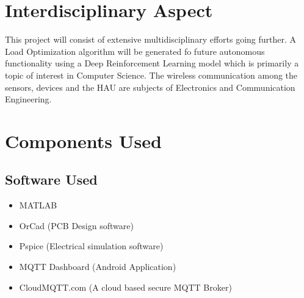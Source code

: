         \section{Interdisciplinary Aspect}
        	This project will consist of extensive multidisciplinary efforts going further.
        	A Load Optimization algorithm will be generated fo future autonomous functionality using a Deep Reinforcement Learning model which is primarily a topic of interest in Computer Science.
        	The wireless communication among the sensors, devices and the HAU are subjects of Electronics and Communication Engineering.\\
        \section{Components Used}
	        \subsection{Software Used}
	        \begin{itemize}
	        	\item MATLAB
	        	\item OrCad  (PCB Design software)
	        	\item Pspice (Electrical simulation software)
	        	\item MQTT Dashboard (Android Application)
	        	\item CloudMQTT.com (A cloud based secure MQTT Broker)
	        \end{itemize}
	        
